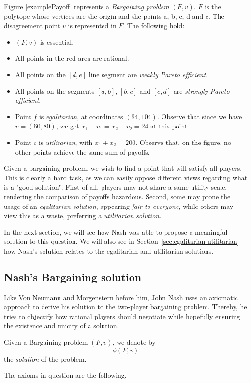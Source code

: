 \begin{example}
\label{example2Barg}
 Figure \ref{examplePayoff} represents a \emph{Bargaining problem} $(F,v)$.   $F$ is the polytope whose vertices are the origin and the points a, b, c, d and e.  The disagreement point $v$ is represented in $F$.
The following hold:
\begin{itemize}
\item $(F,v)$ is essential.
\item All points in the red area are rational.
\item All points on the $[d,e]$ line segment are \emph{weakly Pareto efficient}.
\item All points on the segments $[a,b]$, $[b,c]$ and $[c,d]$ are \emph{strongly Pareto efficient}.
\item Point $f$ is \emph{egalitarian}, at coordinates $(84,104)$. Observe that since we have $v = (60,80)$, we get $x_1 - v_1 = x_2 - v_2 = 24$ at this point.
\item Point $c$ is \emph{utilitarian}, with $x_1 + x_2 = 200$. Observe that, on the figure, no other points achieve the same  sum of payoffs.
\end{itemize}
\end{example}


Given a bargaining problem, we wish to find a point that will satisfy all players.
This is clearly a hard task, as we can easily oppose different views regarding what is a "good solution".
First of all, players may not share a same utility scale, rendering the comparison of payoffs hazardous.
Second, some may prone the usage of an \emph{eqalitarian solution}, appearing \emph{fair to everyone}, while others may view this as a waste, preferring a \emph{utilitarian solution}.

In the next section, we will see how Nash was able to propose a meaningful solution to this question. We will also see in Section~\ref{sec:egalitarian-utilitarian} how Nash's solution relates to the egalitarian and utilitarian solutions.



\subsection{Nash's Bargaining solution}



Like Von Neumann and Morgenstern before him, John Nash uses an axiomatic approach to derive his solution to the two-player bargaining problem. Thereby, he tries to objectify how rational players should negotiate while hopefully ensuring the existence and unicity of a solution.
\begin{notation}
Given a Bargaining problem $(F,v)$, we denote by
$$ \phi(F,v) $$
the \emph{solution} of the problem.
\end{notation}
 The axioms in question are the following.

